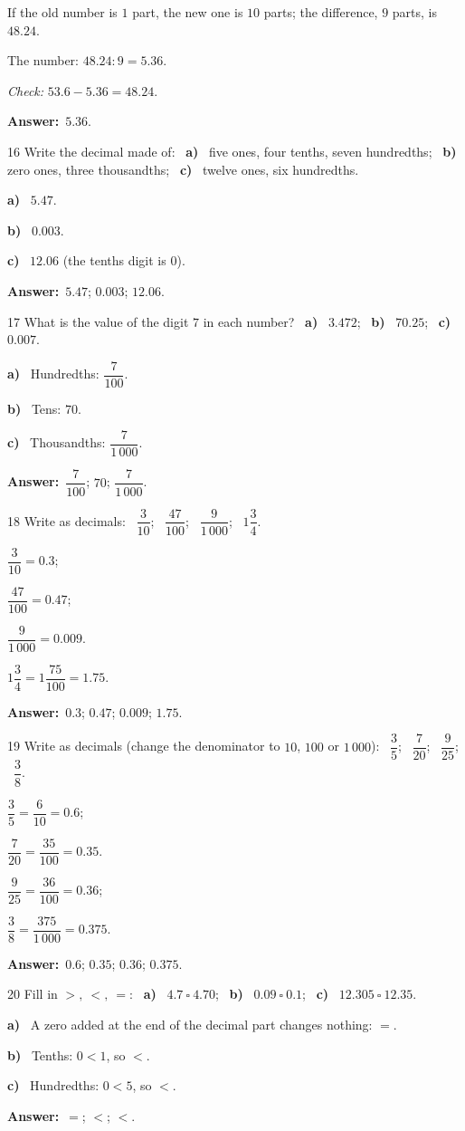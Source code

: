 \documentclass[11pt]{article}
\newif\ifsol \solfalse
\providecommand{\AnsWord}{Đáp số}
\newcommand{\dapso}[1]{\par\textbf{\AnsWord:}\ #1}
\newcommand{\probsol}[1]{%
  \begin{lrbox}{\solmeasure}\begin{minipage}{\dimexpr\linewidth-24pt\relax}#1\end{minipage}\end{lrbox}%
  \ifsol
    \begin{solbox}#1\end{solbox}%
  \else
    \setlength{\solht}{\dimexpr\ht\solmeasure+\dp\solmeasure+0.85cm\relax}%
    \ifdim\solht<1.35cm\setlength{\solht}{1.35cm}\fi
    \begin{tcolorbox}[colback=white,colframe=Line,boxrule=0.8pt,arc=5pt,
      left=8pt,right=8pt,top=4pt,bottom=4pt,height=\solht]{\footnotesize\color{Slate}\itshape\WorkWord}\end{tcolorbox}%
  \fi}
\newcommand{\pa}[1]{\textbf{#1)}\ }
\newcommand{\gap}{\vspace{0.3cm}}
\def\WorkWord{Your work:}
\def\AnsWord{Answer}
\begin{document}
\probsol{
If the old number is $1$ part, the new one is $10$ parts; the difference, $9$ parts, is $48.24$.\par
The number: $48.24:9=5.36$.\par \emph{Check:} $53.6-5.36=48.24$.
\dapso{$5.36$.}}
\gap
\begin{probbox}{16}{\relax}
Write the decimal made of: \ \pa{a} five ones, four tenths, seven hundredths; \ \pa{b} zero ones, three thousandths; \ \pa{c} twelve ones, six hundredths.
\end{probbox}
\probsol{
\pa{a} $5.47$.\par \pa{b} $0.003$.\par \pa{c} $12.06$ (the tenths digit is $0$).
\dapso{$5.47$; $0.003$; $12.06$.}}
\gap
\begin{probbox}{17}{\relax}
What is the value of the digit $7$ in each number? \ \pa{a} $3.472$; \ \pa{b} $70.25$; \ \pa{c} $0.007$.
\end{probbox}
\probsol{
\pa{a} Hundredths: $\dfrac7{100}$.\par \pa{b} Tens: $70$.\par \pa{c} Thousandths: $\dfrac7{1\,000}$.
\dapso{$\dfrac7{100}$; $70$; $\dfrac7{1\,000}$.}}
\gap
\begin{probbox}{18}{\relax}
Write as decimals: \ $\dfrac3{10}$; \ $\dfrac{47}{100}$; \ $\dfrac9{1\,000}$; \ $1\dfrac34$.
\end{probbox}
\probsol{
$\dfrac3{10}=0.3$;\par $\dfrac{47}{100}=0.47$;\par $\dfrac9{1\,000}=0.009$.\par $1\dfrac34=1\dfrac{75}{100}=1.75$.
\dapso{$0.3$; $0.47$; $0.009$; $1.75$.}}
\gap
\begin{probbox}{19}{\relax}
Write as decimals (change the denominator to $10$, $100$ or $1\,000$): \ $\dfrac35$; \ $\dfrac7{20}$; \ $\dfrac9{25}$; \ $\dfrac38$.
\end{probbox}
\probsol{
$\dfrac35=\dfrac6{10}=0.6$;\par $\dfrac7{20}=\dfrac{35}{100}=0.35$.\par $\dfrac9{25}=\dfrac{36}{100}=0.36$;\par $\dfrac38=\dfrac{375}{1\,000}=0.375$.
\dapso{$0.6$; $0.35$; $0.36$; $0.375$.}}
\gap
\begin{probbox}{20}{\relax}
Fill in $>,\ <,\ =$: \ \pa{a} $4.7\ \square\ 4.70$; \ \pa{b} $0.09\ \square\ 0.1$; \ \pa{c} $12.305\ \square\ 12.35$.
\end{probbox}
\probsol{
\pa{a} A zero added at the end of the decimal part changes nothing: $=$.\par \pa{b} Tenths: $0<1$, so $<$.\par \pa{c} Hundredths: $0<5$, so $<$.
\dapso{$=$; $<$; $<$.}}
\end{document}
